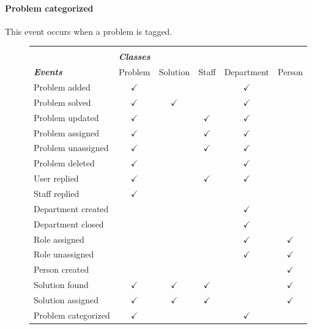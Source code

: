 \paragraph{Problem categorized}
This event occurs when a problem is tagged.


\begin{figure}[]
\begin{tabular}{ l c c c c c} \hline
\\
&\emph{\textbf{Classes}} &  &  & &  \\ 
\emph{\textbf{Events}} & Problem & Solution & Staff & Department & Person \\ \hline
 Problem added 				& $ \checkmark $ &  &  & $ \checkmark $ &  \\ 
 Problem solved 			& $ \checkmark $ & $ \checkmark $ &  & $ \checkmark $ &  \\ 
 Problem updated 			& $ \checkmark $ &  & $ \checkmark $ & $ \checkmark $ &  \\ 
 Problem assigned 		& $ \checkmark $ &  & $ \checkmark $ & $ \checkmark $ &  \\ 
 Problem unassigned 	& $ \checkmark $ &  & $ \checkmark $ & $ \checkmark $ &  \\ 
 Problem deleted 			& $ \checkmark $ &  &  & $ \checkmark $ &  \\ 
 User replied 				& $ \checkmark $ &  & $ \checkmark $ & $ \checkmark $ &  \\ 
 Staff replied 				& $ \checkmark $ &  &  &  &  \\ 
 Department created 	&  &  &  & $ \checkmark $ &  \\ 
 Department closed 		&  &  &  & $ \checkmark $ &  \\ 
 Role assigned 				&  &  &  & $ \checkmark $ & $ \checkmark $  \\ 
 Role unassigned 			&  &  &  &  $ \checkmark $  & $ \checkmark $ \\ 
 Person created 			&  &  &  &  & $ \checkmark $ \\ 
 Solution found 			& $ \checkmark $ & $ \checkmark $ & $ \checkmark $ &  & $ \checkmark $ \\ 
 Solution assigned		& $ \checkmark $ & $ \checkmark $ & $ \checkmark $ &  & $ \checkmark $ \\ 
 Problem categorized	& $ \checkmark $ &  &  & $ \checkmark $ &  \\ \hline
\end{tabular}
\label{fig:classeseventstable}
\end{figure}


